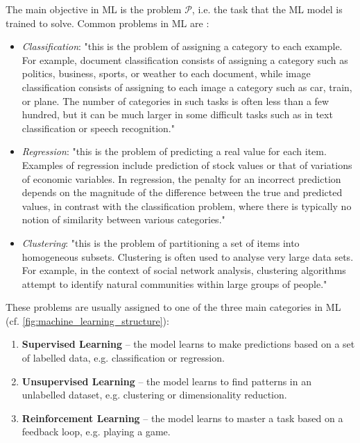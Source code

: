 The main objective in ML is the problem $\mathcal{P}$, i.e. the task that the ML model is trained to solve. %
Common problems in ML are \cite{mohri_foundations_2018}:
\begin{itemize}
    \item \textit{Classification}: "this is the problem of assigning a category to each example. For example, document classification consists of assigning a category such as politics, business, sports, or weather to each document, while image classification consists of assigning to each image a category such as car, train, or plane. The number of categories in such tasks is often less than a few hundred, but it can be much larger in some difficult tasks such as in text classification or speech recognition."
    \item \textit{Regression}: "this is the problem of predicting a real value for each item. Examples of regression include prediction of stock values or that of variations of economic variables. In regression, the penalty for an incorrect prediction depends on the magnitude of the difference between the true and predicted values, in contrast with the classification problem, where there is typically no notion of similarity between various categories."
    \item \textit{Clustering}: "this is the problem of partitioning a set of items into homogeneous subsets. Clustering is often used to analyse very large data sets. For example, in the context of social network analysis, clustering algorithms attempt to identify natural communities within large groups of people."
\end{itemize}

These problems are usually assigned to one of the three main categories in ML (cf. \cref{fig:machine_learning_structure}):

\begin{enumerate}
    \item \textbf{Supervised Learning} -- the model learns to make predictions based on a set of labelled data, e.g. classification or regression.
    \item \textbf{Unsupervised Learning} -- the model learns to find patterns in an unlabelled dataset, e.g. clustering or dimensionality reduction.
    \item \textbf{Reinforcement Learning} -- the model learns to master a task based on a feedback loop, e.g. playing a game.
\end{enumerate}

